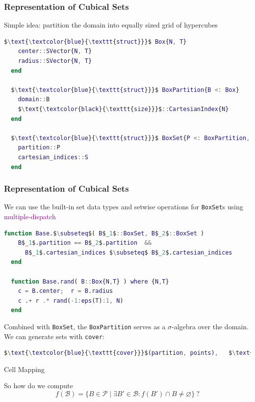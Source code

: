 \documentclass[
  english,            %
  aspectratio=169,    %
]{tumbeamer}
\newcommand{\cB}{\mathcal{B}}
\newcommand{\cP}{\mathcal{P}}
\renewcommand{\emph}[1]{\textcolor{purple}{#1}}
\begin{document}
\begin{frame}[fragile]
\frametitle{Representation of Cubical Sets}

Simple idea: partition the domain into equally sized grid of hypercubes

\begin{lstlisting}[language=Matlab,mathescape]
  $\text{\textcolor{blue}{\texttt{struct}}}$ Box{N, T}
    center::SVector{N, T}
    radius::SVector{N, T}
  end

  $\text{\textcolor{blue}{\texttt{struct}}}$ BoxPartition{B <: Box}
    domain::B
    $\text{\textcolor{black}{\texttt{size}}}$::CartesianIndex{N}
  end

  $\text{\textcolor{blue}{\texttt{struct}}}$ BoxSet{P <: BoxPartition, S <: AbstractSet{<:CartesianIndex}}
    partition::P
    cartesian_indices::S
  end
\end{lstlisting}



\end{frame}

\begin{frame}[fragile]
\frametitle{Representation of Cubical Sets}

We can use the built-in set data types and setwise operations for \texttt{BoxSet}s using \emph{multiple-dispatch}

\begin{lstlisting}[language=Matlab,mathescape]
  function Base.$\subseteq$( B$_1$::BoxSet, B$_2$::BoxSet )
    B$_1$.partition == B$_2$.partition  && 
      B$_1$.cartesian_indices $\subseteq$ B$_2$.cartesian_indices
  end

  function Base.rand( B::Box{N,T} ) where {N,T}
    c = B.center;  r = B.radius
    c .+ r .* rand(-1:eps(T):1, N)
  end
\end{lstlisting}

Combined with \texttt{BoxSet}, the \texttt{BoxPartition} serves as a $\sigma$-algebra over the domain. We can generate sets with \texttt{cover}:

\begin{lstlisting}[language=Matlab,mathescape]
  $\text{\textcolor{blue}{\texttt{cover}}}$(partition, points),   $\text{\textcolor{blue}{\texttt{cover}}}$(partition, other_boxset)
\end{lstlisting}

\end{frame}

\begin{frame}{Cell Mapping}

So how do we compute 
\[
  f(\cB) = \{ B\in\cP \mid \exists B'\in\cB: f(B')\cap B \neq \varnothing\}\ ?
\]

\begin{figure}
  \label{fig:boximage}
\end{figure}

\end{frame}
\end{document}
